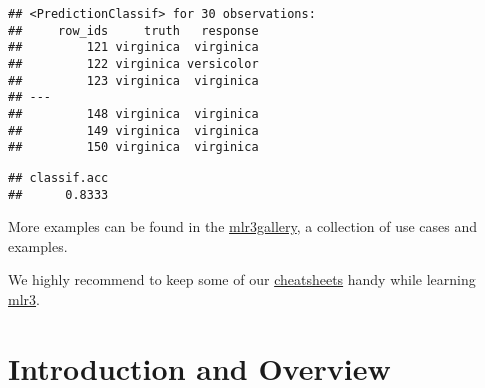 \documentclass[
]{scrbook}
\newenvironment{Shaded}{\begin{snugshade}}{\end{snugshade}}
\newcommand{\AttributeTok}[1]{\textcolor[rgb]{0.77,0.63,0.00}{#1}}
\newcommand{\CommentTok}[1]{\textcolor[rgb]{0.56,0.35,0.01}{\textit{#1}}}
\newcommand{\DecValTok}[1]{\textcolor[rgb]{0.00,0.00,0.81}{#1}}
\newcommand{\FunctionTok}[1]{\textcolor[rgb]{0.00,0.00,0.00}{#1}}
\newcommand{\NormalTok}[1]{#1}
\newcommand{\OtherTok}[1]{\textcolor[rgb]{0.56,0.35,0.01}{#1}}
\newcommand{\SpecialCharTok}[1]{\textcolor[rgb]{0.00,0.00,0.00}{#1}}
\newcommand{\StringTok}[1]{\textcolor[rgb]{0.31,0.60,0.02}{#1}}
\renewenvironment{Shaded} {\begin{snugshade}\small} {\end{snugshade}}
\begin{document}
\begin{Shaded}
\end{Shaded}

\begin{verbatim}
## <PredictionClassif> for 30 observations:
##     row_ids     truth   response
##         121 virginica  virginica
##         122 virginica versicolor
##         123 virginica  virginica
## ---                             
##         148 virginica  virginica
##         149 virginica  virginica
##         150 virginica  virginica
\end{verbatim}

\begin{Shaded}
\end{Shaded}

\begin{verbatim}
## classif.acc 
##      0.8333
\end{verbatim}

More examples can be found in the \href{https://mlr3gallery.mlr-org.com}{mlr3gallery}, a collection of use cases and examples.

We highly recommend to keep some of our \href{https://cheatsheets.mlr-org.com}{cheatsheets} handy while learning \href{https://mlr3.mlr-org.com}{mlr3}.

\hypertarget{introduction}{%
\chapter{Introduction and Overview}\label{introduction}}
\end{document}

